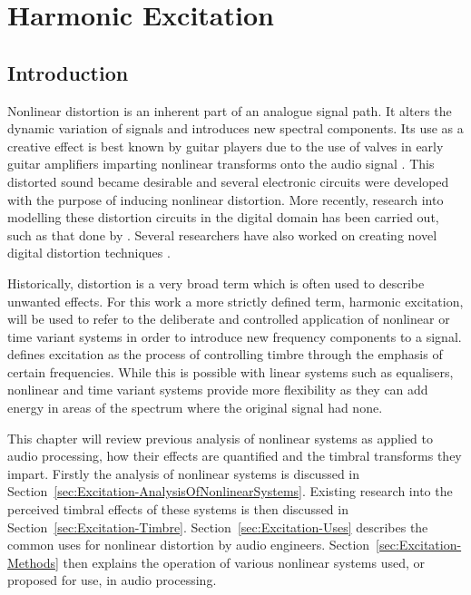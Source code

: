 \chapter{Harmonic Excitation}
\label{chap:Excitation}

\section{Introduction}
\label{sec:Excitation-Introduction}
	Nonlinear distortion is an inherent part of an analogue signal path. It alters the dynamic variation of signals and
	introduces new spectral components. Its use as a creative effect is best known by guitar players due to the use of
	valves in early guitar amplifiers imparting nonlinear transforms onto the audio signal
	\citep{dutilleux2011nonlinear}. This distorted sound became desirable and several electronic circuits were
	developed with the purpose of inducing nonlinear distortion. More recently, research into modelling these
	distortion circuits in the digital domain has been carried out, such as that done by \citet{pakarinen2009a}.
	Several researchers have also worked on creating novel digital distortion techniques
	\citep{fernandez-cid2001distortion, puckette2007patch, pekonen2008coefficient}.

	Historically, distortion is a very broad term which is often used to describe unwanted effects. For this work a
	more strictly defined term, harmonic excitation, will be used to refer to the deliberate and controlled application
	of nonlinear or time variant systems in order to introduce new frequency components to a signal.
	\citet{dutilleux2011nonlinear} defines excitation as the process of controlling timbre through the emphasis of
	certain frequencies. While this is possible with linear systems such as equalisers, nonlinear and time variant
	systems provide more flexibility as they can add energy in areas of the spectrum where the original signal had
	none.

	This chapter will review previous analysis of nonlinear systems as applied to audio processing, how their effects
	are quantified and the timbral transforms they impart. Firstly the analysis of nonlinear systems is discussed in
	Section~\ref{sec:Excitation-AnalysisOfNonlinearSystems}. Existing research into the perceived timbral effects of
	these systems is then discussed in Section~\ref{sec:Excitation-Timbre}. Section~\ref{sec:Excitation-Uses} describes
	the common uses for nonlinear distortion by audio engineers. Section~\ref{sec:Excitation-Methods} then explains the
	operation of various nonlinear systems used, or proposed for use, in audio processing.

